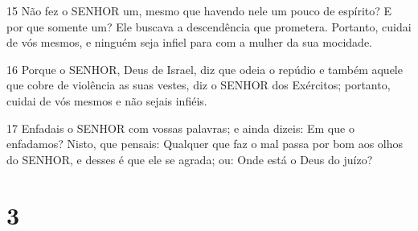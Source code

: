 \par 15 Não fez o SENHOR um, mesmo que havendo nele um pouco de espírito? E por que somente um? Ele buscava a descendência que prometera. Portanto, cuidai de vós mesmos, e ninguém seja infiel para com a mulher da sua mocidade.
\par 16 Porque o SENHOR, Deus de Israel, diz que odeia o repúdio e também aquele que cobre de violência as suas vestes, diz o SENHOR dos Exércitos; portanto, cuidai de vós mesmos e não sejais infiéis.
\par 17 Enfadais o SENHOR com vossas palavras; e ainda dizeis: Em que o enfadamos? Nisto, que pensais: Qualquer que faz o mal passa por bom aos olhos do SENHOR, e desses é que ele se agrada; ou: Onde está o Deus do juízo?

\chapter{3}

